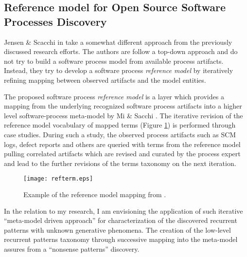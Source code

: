 \subsection{Reference model for Open Source Software Processes Discovery}
Jensen \& Scacchi in \cite{citeulike:5043664} take a somewhat different approach from the previously discussed research efforts. The authors are follow a top-down approach and do not try to build a software process model from available process artifacts. Instead, they try to develop a software process \textit{reference model} by iteratively refining mapping between observed artifacts and the model entities. 

The proposed software process \textit{reference model} is a layer which provides a mapping from the underlying recognized software process artifacts into a higher level software-process meta-model by Mi \& Sacchi \cite{citeulike:5128872}. The iterative revision of the reference model vocabulary of mapped terms (Figure \ref{fig:refterm}) is performed through case studies. During such a study, the observed process artifacts such as SCM logs, defect reports and others are queried with terms from the reference model pulling correlated artifacts which are revised and curated by the process expert and lead to the further revisions of the terms taxonomy on the next iteration.

\begin{figure}[tbp]
   \centering
   \texttt{[image: refterm.eps]}
   \caption{Example of the reference model mapping from \cite{citeulike:5043664}.}
   \label{fig:refterm}
\end{figure}

In the relation to my research, I am envisioning the application of such iterative ``meta-model driven approach'' for characterization of the discovered recurrent patterns with unknown generative phenomena. The creation of the low-level recurrent patterns taxonomy through successive mapping into the meta-model assures from a ``nonsense patterns'' discovery.